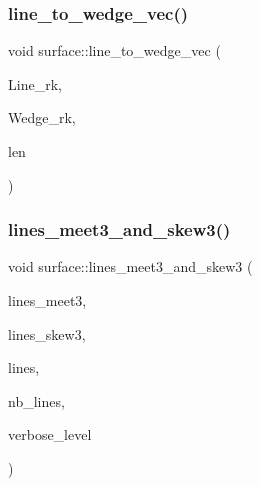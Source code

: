\mbox{\label{classsurface_a994181d5df6a966940ad798411f21fe8}} 
\subsubsection{\texorpdfstring{line\+\_\+to\+\_\+wedge\+\_\+vec()}{line\_to\_wedge\_vec()}}
{\footnotesize\ttfamily void surface\+::line\+\_\+to\+\_\+wedge\+\_\+vec (\begin{DoxyParamCaption}\item[{\mbox{\hyperlink{galois_8h_a09fddde158a3a20bd2dcadb609de11dc}{I\+NT}} $\ast$}]{Line\+\_\+rk,  }\item[{\mbox{\hyperlink{galois_8h_a09fddde158a3a20bd2dcadb609de11dc}{I\+NT}} $\ast$}]{Wedge\+\_\+rk,  }\item[{\mbox{\hyperlink{galois_8h_a09fddde158a3a20bd2dcadb609de11dc}{I\+NT}}}]{len }\end{DoxyParamCaption})}

\mbox{\label{classsurface_af87ed9d20b980a89342f20c206ae5790}} 
\subsubsection{\texorpdfstring{lines\+\_\+meet3\+\_\+and\+\_\+skew3()}{lines\_meet3\_and\_skew3()}}
{\footnotesize\ttfamily void surface\+::lines\+\_\+meet3\+\_\+and\+\_\+skew3 (\begin{DoxyParamCaption}\item[{\mbox{\hyperlink{galois_8h_a09fddde158a3a20bd2dcadb609de11dc}{I\+NT}} $\ast$}]{lines\+\_\+meet3,  }\item[{\mbox{\hyperlink{galois_8h_a09fddde158a3a20bd2dcadb609de11dc}{I\+NT}} $\ast$}]{lines\+\_\+skew3,  }\item[{\mbox{\hyperlink{galois_8h_a09fddde158a3a20bd2dcadb609de11dc}{I\+NT}} $\ast$\&}]{lines,  }\item[{\mbox{\hyperlink{galois_8h_a09fddde158a3a20bd2dcadb609de11dc}{I\+NT}} \&}]{nb\+\_\+lines,  }\item[{\mbox{\hyperlink{galois_8h_a09fddde158a3a20bd2dcadb609de11dc}{I\+NT}}}]{verbose\+\_\+level }\end{DoxyParamCaption})}

